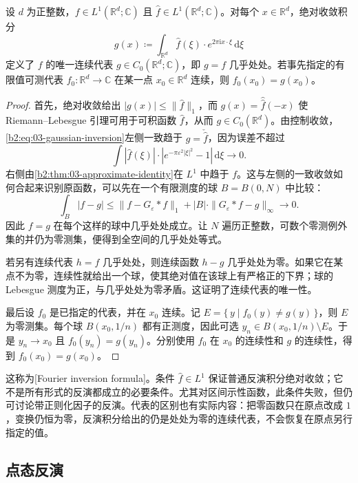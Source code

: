 \begin{theorem}[Fourier 反演]\label{b2:thm:03-inversion}
设 \(d\) 为正整数，\(f\in L^1(\mathbb R^d;\mathbb C)\) 且 \(\widehat f\in L^1(\mathbb R^d;\mathbb C)\)。对每个 \(x\in\mathbb R^d\)，绝对收敛积分
\[
 g(x)\coloneqq\int_{\mathbb R^d}\widehat f(\xi)\cdot e^{2\pi\mathrm{i}x\cdot\xi}\,\mathrm{d}\xi
\]
定义了 \(f\) 的唯一连续代表 \(g\in C_0(\mathbb R^d;\mathbb C)\)，即 \(g=f\) 几乎处处。若事先指定的有限值可测代表 \(f_0\colon\mathbb R^d\to\mathbb C\) 在某一点 \(x_0\in\mathbb R^d\) 连续，则 \(f_0(x_0)=g(x_0)\)。
\end{theorem}
\begin{proof}
首先，绝对收敛给出 \(|g(x)|\leq\|\widehat f\|_1\)，而 \(g(x)=\widehat{\widehat f}(-x)\) 使 Riemann--Lebesgue 引理可用于可积函数 \(\widehat f\)，从而 \(g\in C_0(\mathbb R^d)\)。由控制收敛，\eqref{b2:eq:03-gaussian-inversion}左侧一致趋于 \(g=\check {\widehat f}\)，因为误差不超过
\[
 \int|\widehat f(\xi)|\cdot|e^{-\pi\varepsilon^2|\xi|^2}-1|\,\mathrm{d}\xi\longrightarrow0.
\]
右侧由\cref{b2:thm:03-approximate-identity}在 \(L^1\) 中趋于 \(f\)。这与左侧的一致收敛如何合起来识别原函数，可以先在一个有限测度的球 \(B=B(0,N)\) 中比较：
\[
 \int_B|f-g|
 \leq\|f-G_\varepsilon*f\|_1
       +|B|\cdot\|G_\varepsilon*f-g\|_\infty
 \longrightarrow0.
\]
因此 \(f=g\) 在每个这样的球中几乎处处成立。让 \(N\) 遍历正整数，可数个零测例外集的并仍为零测集，便得到全空间的几乎处处等式。

若另有连续代表 \(h=f\) 几乎处处，则连续函数 \(h-g\) 几乎处处为零。如果它在某点不为零，连续性就给出一个球，使其绝对值在该球上有严格正的下界；球的 Lebesgue 测度为正，与几乎处处为零矛盾。这证明了连续代表的唯一性。

最后设 \(f_0\) 是已指定的代表，并在 \(x_0\) 连续。记 \(E=\{\,y\mid f_0(y)\ne g(y)\,\}\)，则 \(E\) 为零测集。每个球 \(B(x_0,1/n)\) 都有正测度，因此可选 \(y_n\in B(x_0,1/n)\setminus E\)。于是 \(y_n\to x_0\) 且 \(f_0(y_n)=g(y_n)\)。分别使用 \(f_0\) 在 \(x_0\) 的连续性和 \(g\) 的连续性，得到 \(f_0(x_0)=g(x_0)\)。
\end{proof}

这称为[Fourier inversion formula]。条件 \(\widehat f\in L^1\) 保证普通反演积分绝对收敛；它不是所有形式的反演都成立的必要条件。尤其对区间示性函数，此条件失败，但仍可讨论带正则化因子的反演。代表的区别也有实际内容：把零函数只在原点改成 \(1\)，变换仍恒为零，反演积分给出的仍是处处为零的连续代表，不会恢复在原点另行指定的值。

\subsection{点态反演}
\label{b2:subsec:030503}

